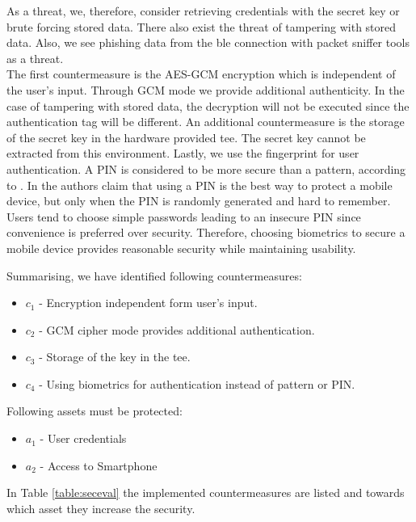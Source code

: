 As a threat, we, therefore, consider retrieving credentials with the secret key or brute forcing stored data. There also exist the threat of tampering with stored data. Also, we see phishing data from the \gls{ble} connection with packet sniffer tools as a threat. \\
%
The first countermeasure is the AES-GCM encryption which is independent of the user's input. Through GCM mode we provide additional authenticity. In the case of tampering with stored data, the decryption will not be executed since the authentication tag will be different. An additional countermeasure is the storage of the secret key in the hardware provided \gls{tee}. The secret key cannot be extracted from this environment. Lastly, we use the fingerprint for user authentication. A PIN is considered to be more secure than a pattern, according to \cite{PinSaferThanPattern}. In \cite{SecureWayToLockPhone} the authors claim that using a PIN is the best way to protect a mobile device, but only when the PIN is randomly generated and hard to remember. Users tend to choose simple passwords leading to an insecure PIN since convenience is preferred over security. Therefore, choosing biometrics to secure a mobile device provides reasonable security while maintaining usability.

\noindent Summarising, we have identified following countermeasures:
\begin{itemize}
\item $c_1$ - Encryption independent form user's input.
\item $c_2$ - GCM cipher mode provides additional authentication.
\item $c_3$ - Storage of the key in the \gls{tee}.
\item $c_4$ - Using biometrics for authentication instead of pattern or PIN.
\end{itemize}
\vspace{0.5cm}

\noindent Following assets must be protected:
\begin{itemize}
\item $a_1$ - User credentials
\item $a_2$ - Access to Smartphone
\end{itemize}
\vspace{0.5cm}

In Table \ref{table:seceval} the implemented countermeasures are listed and towards which asset they increase the security. \\


